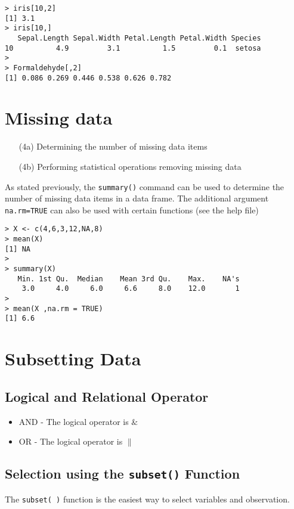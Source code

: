 \documentclass[a4paper,12pt]{article}
\begin{document}
\begin{verbatim}
> iris[10,2]
[1] 3.1
> iris[10,] 
   Sepal.Length Sepal.Width Petal.Length Petal.Width Species
10          4.9         3.1          1.5         0.1  setosa
> 
> Formaldehyde[,2]  
[1] 0.086 0.269 0.446 0.538 0.626 0.782
\end{verbatim}
\section{Missing data}
\begin{itemize}
\item[(4a)] Determining the number of missing data items
\item[(4b)] Performing statistical operations removing missing data
\end{itemize}

As stated previously, the \texttt{summary()} command can be used to determine the number of missing data items in a data frame. The additional argument \texttt{na.rm=TRUE} can also be used with certain functions (see the help file)

\begin{verbatim}
> X <- c(4,6,3,12,NA,8)
> mean(X)
[1] NA
>
> summary(X)
   Min. 1st Qu.  Median    Mean 3rd Qu.    Max.    NA's 
    3.0     4.0     6.0     6.6     8.0    12.0       1
>
> mean(X ,na.rm = TRUE)
[1] 6.6
\end{verbatim}
\newpage
\section{Subsetting Data}
\subsection*{Logical and Relational Operator}

\begin{itemize}
\item AND - The logical operator is $\&$
\item OR - The logical operator is $\|$
\end{itemize}

\subsection*{Selection using the \texttt{subset()} Function}
The \texttt{subset( )} function is the easiest way to select variables and observation. 
\end{document}
